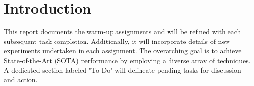 \section{Introduction}
\label{sec:intro}
    This report documents the warm-up assignments and will be refined with each subsequent task completion. Additionally, it will incorporate details of new experiments undertaken in each assignment. The overarching goal is to achieve State-of-the-Art (SOTA) performance by employing a diverse array of techniques. A dedicated section labeled "To-Do" will delineate pending tasks for discussion and action. 
